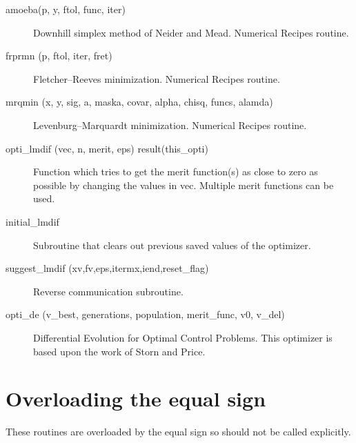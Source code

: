 \begin{description}


\item[amoeba(p, y, ftol, func, iter)] \Newline
Downhill simplex method of Neider and Mead. Numerical Recipes routine.

\item[frprmn (p, ftol, iter, fret)] \Newline
Fletcher--Reeves minimization. Numerical Recipes routine.

\item[mrqmin (x, y, sig, a, maska, covar, alpha, chisq, funcs, alamda)] \Newline
Levenburg--Marquardt minimization. Numerical Recipes routine.

\item[opti_lmdif (vec, n, merit, eps) result(this_opti)] \Newline 
Function which tries to get the merit function(s) as close to zero as possible
by changing the values in vec. Multiple merit functions can be used.

\item[initial_lmdif] \Newline 
Subroutine that clears out previous saved values of the optimizer.

\item[suggest_lmdif (xv,fv,eps,itermx,iend,reset_flag)] \Newline 
Reverse communication subroutine. 

\item[opti_de (v_best, generations, population, merit_func, v0, v_del)] \Newline 
Differential Evolution for Optimal Control Problems.
This optimizer is based upon the work of Storn and Price. 

\end{description}

\section{Overloading the equal sign}
\label{r:equal}    

These routines are overloaded by the equal sign so should not be called explicitly.

